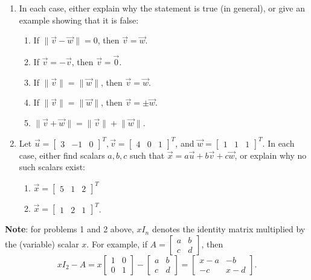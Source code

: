 \documentclass[letterpaper,12pt]{article}
\newcommand{\len}[1]{\lVert #1\rVert}
\begin{document}
\begin{enumerate}
\item In each case, either explain why the statement is true (in general), or give an example showing that it is false:
\begin{enumerate}
 \item If $\len{\vec{v}-\vec{w}}=0$, then $\vec{v}=\vec{w}$.
 \item If $\vec{v}=-\vec{v}$, then $\vec{v}=\vec{0}$.
 \item If $\len{\vec{v}}=\len{\vec{w}}$, then $\vec{v}=\vec{w}$.
 \item If $\len{\vec{v}}=\len{\vec{w}}$, then $\vec{v}=\pm\vec{w}$.
 \item $\len{\vec{v}+\vec{w}} = \len{\vec{v}}+\len{\vec{w}}$.
\end{enumerate}
\item Let $\vec{u} = \begin{bmatrix}3&-1&0\end{bmatrix}^T, \vec{v} = \begin{bmatrix}4&0&1\end{bmatrix}^T$, and $\vec{w} = \begin{bmatrix}1&1&1\end{bmatrix}^T$. In each case, either find scalars $a,b,c$ such that $\vec{x} = a\vec{u}+b\vec{v}+c\vec{w}$, or explain why no such scalars exist:
\begin{enumerate}
 \item $\vec{x} = \begin{bmatrix}5&1&2\end{bmatrix}^T$
 \item $\vec{x} = \begin{bmatrix}1&2&1\end{bmatrix}^T$.
\end{enumerate}

 \end{enumerate}
{\bf Note}: for problems 1 and 2 above, $xI_n$ denotes the identity matrix multiplied by the (variable) scalar $x$. For example, if $A = \begin{bmatrix}a&b\\c&d\end{bmatrix}$, then
\[
 xI_2-A = x\begin{bmatrix}1&0\\0&1\end{bmatrix}-\begin{bmatrix}a&b\\c&d\end{bmatrix} = \begin{bmatrix}x-a&-b\\-c&x-d\end{bmatrix}.
\]
\end{document}
